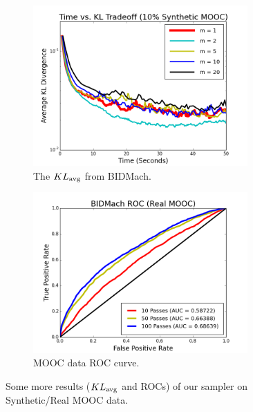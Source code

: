 \documentclass{article} %
\begin{document}
\begin{figure}[t]
\centering
\begin{subfigure}{.5\textwidth}
  \centering
  \includegraphics[width=0.9\textwidth]{fig_kltime_tradeoff_mooc}
  \caption{The $KL_{\rm avg}$ from BIDMach.}
  \label{fig:mooc_kl}
\end{subfigure}%
\begin{subfigure}{.5\textwidth}
  \centering
  \includegraphics[width=0.9\textwidth]{fig_bidmach_real_mooc_roc_curve_v3}
  \caption{MOOC data ROC curve.}
  \label{fig:mooc_accuracy}
\end{subfigure}
\caption{Some more results ($KL_{\rm avg}$ and ROCs) of our sampler on Synthetic/Real MOOC data.}
\label{fig:third_set}
\end{figure}
\end{document}
